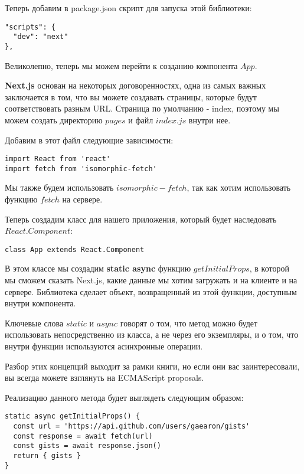 Теперь добавим в package.json скрипт для запуска этой библиотеки:

\begin{lstlisting}
"scripts": {
  "dev": "next"
},
\end{lstlisting}

Великолепно, теперь мы можем перейти к созданию компонента $App$.

\textbf{Next.js} основан на некоторых договоренностях, одна из самых важных заключается в том, что вы можете создавать страницы, которые будут соответствовать разным URL. Страница по умолчанию - index, поэтому мы можем создать директорию $pages$ и файл $index.js$ внутри нее.

Добавим в этот файл следующие зависимости:

\begin{lstlisting}
import React from 'react'
import fetch from 'isomorphic-fetch'
\end{lstlisting}

Мы также будем использовать $isomorphic-fetch$, так как хотим использовать функцию $fetch$ на сервере.

Теперь создадим класс для нашего приложения, который будет наследовать $React.Component$:

\begin{lstlisting}
class App extends React.Component
\end{lstlisting}

В этом классе мы создадим \textbf{static async} функцию $getInitialProps$, в которой мы сможем сказать Next.js, какие данные мы хотим загружать и на клиенте и на сервере. Библиотека сделает объект, возвращенный из этой функции, доступным внутри компонента.

Ключевые слова $static$ и $async$ говорят о том, что метод можно будет использовать непосредственно из класса, а не через его экземпляры, и о том, что внутри функции используются асинхронные операции.

Разбор этих концепций выходит за рамки книги, но если они вас заинтересовали, вы всегда можете взглянуть на ECMAScript proposals.

Реализацию данного метода будет выглядеть следующим образом:

\begin{lstlisting}
static async getInitialProps() {
  const url = 'https://api.github.com/users/gaearon/gists'
  const response = await fetch(url)
  const gists = await response.json()
  return { gists }
}
\end{lstlisting}

